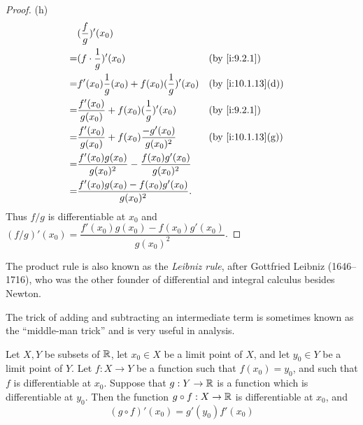 \begin{proof}{(h)}
  \begin{align*}
      & (\dfrac{f}{g})'(x_0)                                                                       \\
    = & (f \cdot \dfrac{1}{g})'(x_0)                                        &  & \by{i:9.2.1}      \\
    = & f'(x_0) \dfrac{1}{g}(x_0) + f(x_0) (\dfrac{1}{g})'(x_0)             &  & \by{i:10.1.13}[d] \\
    = & \dfrac{f'(x_0)}{g(x_0)} + f(x_0) (\dfrac{1}{g})'(x_0)               &  & \by{i:9.2.1}      \\
    = & \dfrac{f'(x_0)}{g(x_0)} + f(x_0) \dfrac{-g'(x_0)}{g(x_0)^2}         &  & \by{i:10.1.13}[g] \\
    = & \dfrac{f'(x_0) g(x_0)}{g(x_0)^2} - \dfrac{f(x_0) g'(x_0)}{g(x_0)^2}                        \\
    = & \dfrac{f'(x_0) g(x_0) - f(x_0) g'(x_0)}{g(x_0)^2}.                                         \\
  \end{align*}
  Thus \(f / g\) is differentiable at \(x_0\) and \((f / g)'(x_0) = \dfrac{f'(x_0) g(x_0) - f(x_0) g'(x_0)}{g(x_0)^2}\).
\end{proof}

\begin{rmk}\label{i:10.1.14}
  The product rule is also known as the \emph{Leibniz rule}, after Gottfried Leibniz (1646--1716), who was the other founder of differential and integral calculus besides Newton.
\end{rmk}

\begin{note}
  The trick of adding and subtracting an intermediate term is sometimes known as the ``middle-man trick'' and is very useful in analysis.
\end{note}

\begin{thm}\label{i:10.1.15}
  Let \(X, Y\) be subsets of \(\mathbb{R}\), let \(x_0 \in X\) be a limit point of \(X\), and let \(y_0 \in Y\) be a limit point of \(Y\).
  Let \(f : X \to Y\) be a function such that \(f(x_0) = y_0\), and such that \(f\) is differentiable at \(x_0\).
  Suppose that \(g : Y \to \mathbb{R}\) is a function which is differentiable at \(y_0\).
  Then the function \(g \circ f : X \to \mathbb{R}\) is differentiable at \(x_0\), and
  \[
    (g \circ f)'(x_0) = g'(y_0) f'(x_0)
  \]
\end{thm}

